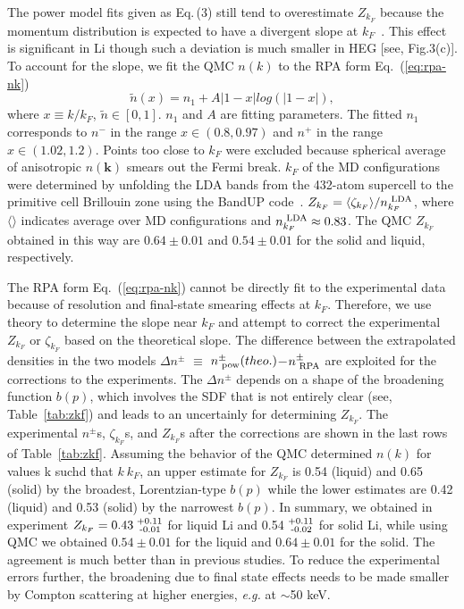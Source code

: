 \documentclass[twocolumn,showpacs,showkeys,fleqn,prl,superscriptaddress]{revtex4}%
\newcommand{\nn}[1]{\textnormal{ #1}}
\begin{document}
The power model fits given as Eq.\,(3) still tend to overestimate $Z_{k_F}$ because the momentum distribution is expected to have a divergent slope at $k_F$~\cite{gg02}.
This effect is significant in Li though such a deviation is much smaller in HEG [see, Fig.3(c)].
To account for the slope, we fit the QMC $n(k)$ to the RPA form Eq.~(\ref{eq:rpa-nk})
\begin{equation} \label{eq:rpa-nk}
\tilde{n}(x) = n_1 + A\vert 1-x\vert log\left(\vert 1-x\vert\right),
\end{equation}
where $x\equiv k/k_F$, $\tilde{n}\in[0,1]$. $n_1$ and $A$ are fitting parameters. The fitted $n_1$ corresponds to $n^-$ in the range $x\in(0.8, 0.97)$ and $n^+$ in the range $x\in(1.02, 1.2)$. Points too close to $k_F$ were excluded because spherical average of anisotropic $n(\boldsymbol{k})$ smears out the Fermi break. $k_F$ of the MD configurations were determined by unfolding the LDA bands from the 432-atom supercell to the primitive cell Brillouin zone using the BandUP code~\cite{Medeiros2014,Medeiros2015}. $Z_{k_F} = \langle\zeta_{k_F}\rangle/n_{k_F}^{\nn{LDA}}$, where
$\langle\rangle$ indicates average over MD configurations and
$n_{k_F}^\nn{LDA}\approx0.83$. The QMC $Z_{k_F}$ obtained in this way are
$0.64\pm0.01$ and $0.54\pm0.01$
for the solid and liquid, respectively.

The RPA form Eq.~(\ref{eq:rpa-nk}) cannot be directly fit to the experimental data because of resolution and final-state smearing effects at $k_F$.
Therefore, we use theory to determine the slope near $k_F$ and attempt to correct the experimental $Z_{k_F}$ or $\zeta_{k_F}$ based on the theoretical slope.
The difference between the extrapolated densities in the two models $\Delta n^{\pm}$ $\equiv$ $n^{\pm}_{\nn{pow}} (theo.)$$-$$n^{\pm}_{\nn{RPA}}$ are exploited for the corrections to the experiments.
The $\Delta n^{\pm}$ depends on a shape of the broadening function $b(p)$, which involves the SDF that is not entirely clear (see, Table~\ref{tab:zkf}) and leads to an uncertainly for determining $Z_{k_F}$.
The experimental $n^{\pm}$s, $\zeta_{k_F}$s, and $Z_{k_F}$s after the corrections are shown in the last rows of Table~\ref{tab:zkf}.
Assuming the behavior of the  QMC determined $n(k)$ for values k suchd that $k ~ k_F$, an upper estimate for $Z_{k_F}$ is  0.54 (liquid) and 0.65 (solid) by the broadest, Lorentzian-type $b(p)$ while the lower estimates are 0.42 (liquid) and 0.53 (solid) by the narrowest $b(p)$.
In summary, we obtained in experiment $Z_{k_F}=  0.43^{\nn{+0.11}}_{\nn{\;-0.01}}$ for liquid Li and 0.54$^{\nn{+0.11}}_{\nn{\;-0.02}}$ for solid Li, while using QMC we obtained $0.54\pm0.01$ for the liquid and $0.64\pm0.01$ for the solid.
The agreement is much better than in previous studies.
To reduce the experimental errors further, the broadening due to final state effects needs to be made smaller by Compton scattering at higher energies, {\it{e.g.}} at $\sim$50 keV.
\end{document}
